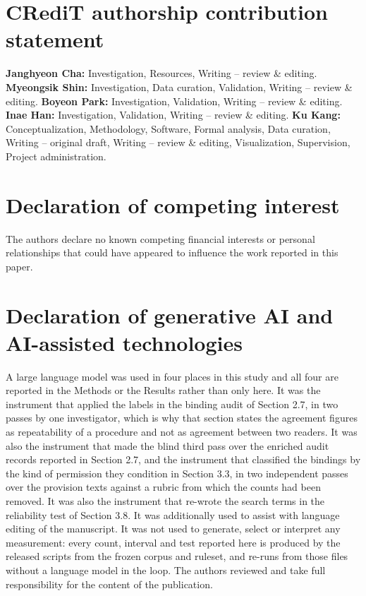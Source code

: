 \section*{CRediT authorship contribution statement}
\textbf{Janghyeon Cha:} Investigation, Resources, Writing -- review \& editing. \textbf{Myeongsik Shin:} Investigation, Data curation, Validation, Writing -- review \& editing. \textbf{Boyeon Park:} Investigation, Validation, Writing -- review \& editing. \textbf{Inae Han:} Investigation, Validation, Writing -- review \& editing. \textbf{Ku Kang:} Conceptualization, Methodology, Software, Formal analysis, Data curation, Writing -- original draft, Writing -- review \& editing, Visualization, Supervision, Project administration.

\section*{Declaration of competing interest}
The authors declare no known competing financial interests or personal relationships that could have appeared to influence the work reported in this paper.

\section*{Declaration of generative AI and AI-assisted technologies}
A large language model was used in four places in this study and all four are reported in the Methods or the Results rather than only here. It was the instrument that applied the labels in the binding audit of Section 2.7, in two passes by one investigator, which is why that section states the agreement figures as repeatability of a procedure and not as agreement between two readers. It was also the instrument that made the blind third pass over the enriched audit records reported in Section 2.7, and the instrument that classified the bindings by the kind of permission they condition in Section 3.3, in two independent passes over the provision texts against a rubric from which the counts had been removed. It was also the instrument that re-wrote the search terms in the reliability test of Section 3.8. It was additionally used to assist with language editing of the manuscript. It was not used to generate, select or interpret any measurement: every count, interval and test reported here is produced by the released scripts from the frozen corpus and ruleset, and re-runs from those files without a language model in the loop. The authors reviewed and take full responsibility for the content of the publication.


